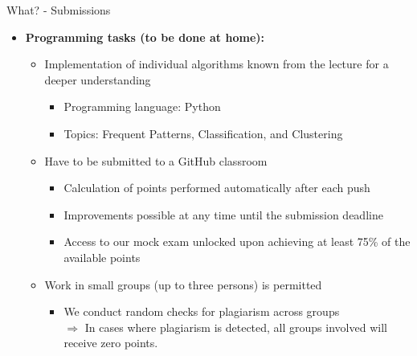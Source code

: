 \begin{frame}{What? - Submissions}
	\begin{itemize}
		\item \textbf{Programming tasks (to be done at home):}
		      \begin{itemize}
			      \item Implementation of individual algorithms known from the lecture for a deeper understanding \\
			            \begin{itemize}
				            \item Programming language: Python
				            \item Topics: Frequent Patterns, Classification, and Clustering
			            \end{itemize}
			      \item Have to be submitted to a GitHub classroom
			            \begin{itemize}
				            \item Calculation of points performed automatically after each push
				            \item Improvements possible at any time until the submission deadline
				            \item Access to our mock exam unlocked upon achieving at least 75\% of the available points
			            \end{itemize}

			      \item Work in small groups (up to three persons) is permitted
			            \begin{itemize}
				            \item We conduct random checks for plagiarism across groups \\
				                  $\Rightarrow$ In cases where plagiarism is detected, all groups involved will receive zero points.
			            \end{itemize}
		      \end{itemize}
	\end{itemize}
\end{frame}

